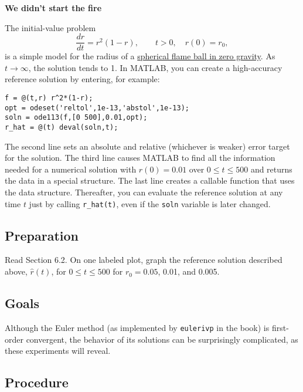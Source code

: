 \documentclass[twoside]{fncextra}
\begin{document}
\begin{center}
  \bf We didn't start the fire
\end{center}

The initial-value problem
\begin{equation}
  \label{eq:8}
  \frac{dr}{dt} = r^2(1-r), \qquad t > 0, \quad r(0)=r_0,
\end{equation}
is a simple model for the radius of a \href{https://youtu.be/Q58-la_yAB4}{spherical flame ball in zero gravity}. As $t\to\infty$, the solution tends to 1. In MATLAB, you can create a high-accuracy reference solution by entering, for example:
\begin{verbatim}
f = @(t,r) r^2*(1-r);
opt = odeset('reltol',1e-13,'abstol',1e-13);
soln = ode113(f,[0 500],0.01,opt);
r_hat = @(t) deval(soln,t);
\end{verbatim}
The second line sets an absolute and relative (whichever is weaker) error target for the solution. The third line causes MATLAB to find all the information needed for a numerical solution with $r(0)=0.01$ over $0\le t \le 500$ and returns the data in a special structure. The last line creates a callable function that uses the data structure. 
Thereafter, you can evaluate the reference solution at any time $t$ just by calling \verb!r_hat(t)!, even if the \texttt{soln} variable is later changed.

\subsection*{Preparation}

Read Section 6.2. On one labeled plot, graph the reference solution described above, $\hat{r}(t)$, for $0\le t\le 500$ for $r_0=0.05$, 0.01, and 0.005. 

\subsection*{Goals}

Although the Euler method (as implemented by \texttt{eulerivp} in the book) is first-order convergent, the behavior of its solutions can be surprisingly complicated, as these experiments will reveal.


\subsection*{Procedure}
\label{sec:procedure}
\end{document}
